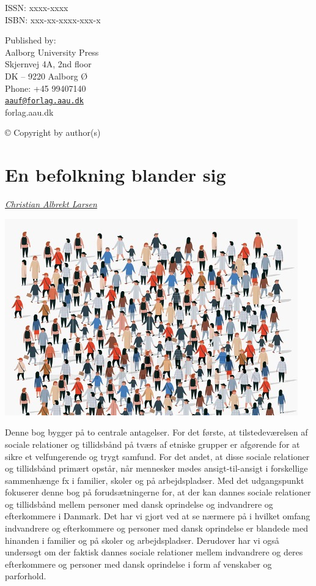 \documentclass[
]{book}
\begin{document}
\newpage

ISSN: xxxx-xxxx\\
ISBN: xxx-xx-xxxx-xxx-x

Published by:\\
Aalborg University Press\\
Skjernvej 4A, 2nd floor\\
DK -- 9220 Aalborg Ø\\
Phone: +45 99407140\\
\href{mailto:aauf@forlag.aau.dk}{\nolinkurl{aauf@forlag.aau.dk}}\\
forlag.aau.dk

© Copyright by author(s)

\chapter{En befolkning blander sig}\label{kap1}

\emph{\href{https://vbn.aau.dk/en/persons/albrekt}{Christian Albrekt Larsen}}

\includegraphics[width=1\linewidth]{images/kap1}

\newpage

Denne bog bygger på to centrale antagelser. For det første, at tilstedeværelsen af sociale relationer og tillidsbånd på tværs af etniske grupper er afgørende for at sikre et velfungerende og trygt samfund. For det andet, at disse sociale relationer og tillidsbånd primært opstår, når mennesker mødes ansigt-til-ansigt i forskellige sammenhænge fx i familier, skoler og på arbejdspladser. Med det udgangspunkt fokuserer denne bog på forudsætningerne for, at der kan dannes sociale relationer og tillidsbånd mellem personer med dansk oprindelse og indvandrere og efterkommere i Danmark. Det har vi gjort ved at se nærmere på i hvilket omfang indvandrere og efterkommere og personer med dansk oprindelse er blandede med hinanden i familier og på skoler og arbejdspladser. Derudover har vi også undersøgt om der faktisk dannes sociale relationer mellem indvandrere og deres efterkommere og personer med dansk oprindelse i form af venskaber og parforhold.
\end{document}
